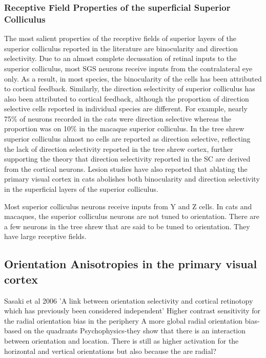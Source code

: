 \subsubsection{Receptive Field Properties of the superficial Superior Colliculus}

The most salient properties of the receptive fields of superior layers of the superior colliculus reported in the literature are binocularity and direction selectivity. Due to an almost complete decussation of retinal inputs to the superior colliculus, most SGS neurons receive inputs from the contralateral eye only. As a result, in most species, the binocularity of the cells has been attributed to cortical feedback. Similarly, the direction selectivity of superior colliculus has also been attributed to cortical feedback, although the proportion of direction selective cells reported in individual species are different. For example, nearly 75\% of neurons recorded in the cats were direction selective whereas the proportion was on 10\% in the macaque superior colliculus. In the tree shrew superior colliculus almost no cells are reported as direction selective, reflecting the lack of direction selectivity reported in the tree shrew cortex, further supporting the theory that direction selectivity reported in the SC are derived from the cortical neurons. Lesion studies have also reported that ablating the primary visual cortex in cats abolishes both binocularity and direction selectivity in the superficial layers of the superior colliculus.

Most superior colliculus neurons receive inputs from Y and Z cells. In cats and macaques, the superior colliculus neurons are not tuned to orientation. There are a few neurons in the tree shrew that are said to be tuned to orientation. They have large receptive fields.

\subsection{Orientation Anisotropies in the primary visual cortex}

Sasaki et al 2006
'A link between orientation selectivity and cortical retinotopy which has previously been considered independent'
Higher contrast sensitivity for the radial orientation bias in the periphery
A more global radial orientation bias- based on the quadrants
Psychophysics-they show that there is an interaction between orientation and location. There is still as higher activation for the horizontal and vertical orientations but also because the are radial?

